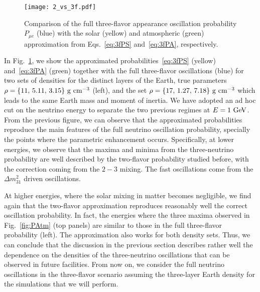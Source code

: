 \begin{figure}
\begin{center}
\texttt{[image: 2\_vs\_3f.pdf]}
\caption{Comparison of the full three-flavor appearance oscillation probability $P_{\mu e}$ (blue) with the solar (yellow) and atmospheric (green) approximation from Eqs.~\eqref{eq:3fPS} and~\eqref{eq:3fPA}, respectively. \label{fig:2vs3f}}
\end{center}
\end{figure}
In Fig.~\ref{fig:2vs3f}, we show the approximated probabilities~\eqref{eq:3fPS} (yellow) and~\eqref{eq:3fPA} (green) together with the full three-flavor oscillations (blue) for two sets of densities for the distinct layers of the Earth, true parameters $\rho=\{11,\,5.11,\,3.15\}~{\rm g\ cm^{-3}}$ (left), and the set $\rho=\{17,\, 1.27,\, 7.18\}~{\rm g\ cm^{-3}}$ which leads to the same Earth mass and moment of inertia. 
We have adopted an ad hoc cut on the neutrino energy to separate the two previous regimes at $E=1~{\rm GeV}$. 
From the previous figure, we can observe that the approximated probabilities reproduce the main features of the full neutrino oscillation probability, specially the points where the parametric enhancement occurs. 
Specifically, at lower energies, we observe that the maxima and minima from the three-neutrino probability are well described by the two-flavor probability studied before, with the correction coming from the $2-3$ mixing. 
The fast oscillations come from the $\Delta m_{31}^2$ driven oscillations.  

At higher energies, where the solar mixing in matter becomes negligible, we find again that the two-flavor approximation reproduces reasonably well the correct oscillation probability. 
In fact, the energies where the three maxima observed in Fig.~\ref{fig:PAtm} (top panels) are similar to those in the full three-flavor probability (left). The approximation also works for both density sets. 
Thus, we can conclude that the discussion in the previous section describes rather well the dependence on the densities of the three-neutrino oscillations that can be observed in future facilities. 
From now on, we consider the full neutrino oscillations in the three-flavor scenario assuming the three-layer Earth density for the simulations that we will perform.

